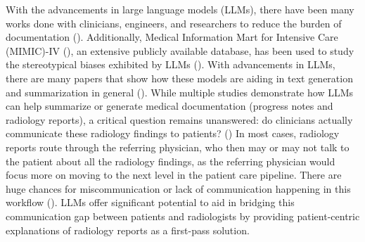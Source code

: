 With the advancements in large language models (LLMs), there have been many works done with clinicians, engineers, and researchers to reduce the burden of documentation (\cite{jeblickChatGPTMakesMedicine2023,patelChatGPTFutureDischarge2023,sunshineEvaluatingQualityUnderstandability2025,thirunavukarasuLargeLanguageModels2023,singhalLargeLanguageModels2023}).
Additionally, Medical Information Mart for Intensive Care (MIMIC)-IV (\cite{johnsonMIMICIV,johnsonMIMICIVNoteDeidentifiedFreetext}), an extensive publicly available database, has been used to study the stereotypical biases exhibited by LLMs (\cite{bolukbasiManComputerProgrammer2016}).
With advancements in LLMs, there are many papers that show how these models are aiding in text generation and summarization in general (\cite{vanveenAdaptedLargeLanguage2024,chenBenchmarkingLargeLanguage2025,buschCurrentApplicationsChallenges2025}).
While multiple studies demonstrate how LLMs can help summarize or generate medical documentation (progress notes and radiology reports), a critical question remains unanswered: do clinicians actually communicate these radiology findings to patients? (\cite{siewertImpactCommunicationErrors2016,europeansocietyofradiologyesrPatientSurveyValue2021,rockallPatientCommunicationRadiology2022,kasalakWorkOverloadDiagnostic2023})
In most cases, radiology reports route through the referring physician, who then may or may not talk to the patient about all the radiology findings, as the referring physician would focus more on moving to the next level in the patient care pipeline.
There are huge chances for miscommunication or lack of communication happening in this workflow (\cite{vandenbergPatientComplaintsRadiology2019,vijanOptimizingPatientCommunication2023}).
LLMs offer significant potential to aid in bridging this communication gap between patients and radiologists by providing patient-centric explanations of radiology reports as a first-pass solution.